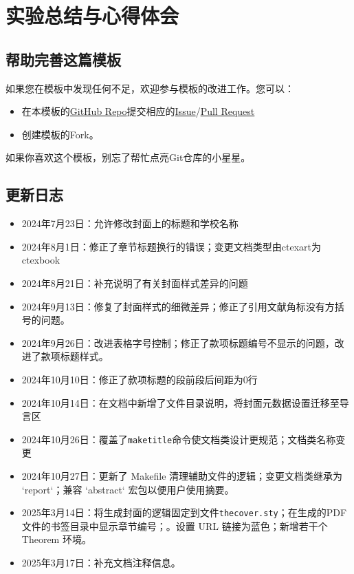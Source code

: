 \chapter{实验总结与心得体会}

\section{帮助完善这篇模板}\label{sec:joinus}

如果您在模板中发现任何不足，欢迎参与模板的改进工作。您可以：

\begin{itemize}
    \item 在本模板的\href{https://github.com/GitHubonline1396529/dlmuucexpreport}{GitHub Repo}提交相应的\href{https://github.com/GitHubonline1396529/dlmuucexpreport/issues}{Issue}/\href{https://github.com/GitHubonline1396529/dlmuucexpreport/pulls}{Pull Request}
    \item 创建模板的Fork。
\end{itemize}

如果你喜欢这个模板，别忘了帮忙点亮Git仓库的小星星。

\section{更新日志}

\begin{itemize}
    \item 2024年7月23日：允许修改封面上的标题和学校名称
    \item 2024年8月1日：修正了章节标题换行的错误；变更文档类型由ctexart为ctexbook
    \item 2024年8月21日：补充说明了有关封面样式差异的问题
    \item 2024年9月13日：修复了封面样式的细微差异；修正了引用文献角标没有方括号的问题。
    \item 2024年9月26日：改进表格字号控制；修正了款项标题编号不显示的问题，改进了款项标题样式。
    \item 2024年10月10日：修正了款项标题的段前段后间距为0行
    \item 2024年10月14日：在文档中新增了文件目录说明，将封面元数据设置迁移至导言区
    \item 2024年10月26日：覆盖了\texttt{maketitle}命令使文档类设计更规范；文档类名称变更
    \item 2024年10月27日：更新了 Makefile 清理辅助文件的逻辑；变更文档类继承为 `report`；兼容 `abstract` 宏包以便用户使用摘要。
    \item 2025年3月14日：将生成封面的逻辑固定到文件\texttt{thecover.sty}；在生成的PDF文件的书签目录中显示章节编号；。设置 URL 链接为蓝色；新增若干个 Theorem 环境。
    \item 2025年3月17日：补充文档注释信息。
\end{itemize}
